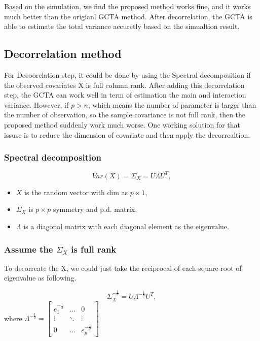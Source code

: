 \documentclass[]{article}
\providecommand{\tightlist}{%
  \setlength{\itemsep}{0pt}\setlength{\parskip}{0pt}}
\begin{document}
Based on the simulation, we find the proposed method works fine, and it
works much better than the origianl GCTA method. After decorrelation,
the GCTA is able to estimate the total variance accuretly based on the
simualtion result.

\subsection{Decorrelation method}\label{decorrelation-method}

For Decoorelation step, it could be done by using the Spectral
decomposition if the observed covariates X is full column rank. After
adding this decorrelation step, the GCTA can work well in term of
estimation the main and interaction variance. However, if \(p > n\),
which means the number of parameter is larger than the number of
observation, so the sample covariance is not full rank, then the
proposed method suddenly work much worse. One working solution for that
issuse is to reduce the dimension of covariate and then apply the
decorrealtion.

\subsubsection{Spectral decomposition}\label{spectral-decomposition}

\[
  Var(X) = \Sigma_X = U\Lambda U^T,
\]

\begin{itemize}
\tightlist
\item
  \(X\) is the random vector with dim as \(p \times 1\),\\
\item
  \(\Sigma_X\) is \(p \times p\) symmetry and p.d. matrix,\\
\item
  \(\Lambda\) is a diagonal matrix with each diagonal element as the
  eigenvalue.
\end{itemize}

\subsubsection{\texorpdfstring{Assume the \(\Sigma_X\) is full
rank}{Assume the \textbackslash{}Sigma\_X is full rank}}\label{assume-the-sigma_x-is-full-rank}

To decorreate the X, we could just take the reciprocal of each square
root of eigenvalue as following.

\[
  \Sigma^{-\frac{1}{2}}_X = U\Lambda^{-\frac{1}{2}}U^T,
\] where
\(\Lambda^{-\frac{1}{2}} = \begin{bmatrix}  e_1^{-\frac{1}{2}} & \dots & 0 \\  \vdots & \ddots & \vdots \\  0 & \dots & e_p^{-\frac{1}{2}}  \end{bmatrix}\)
\end{document}
